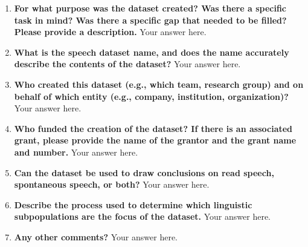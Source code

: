 \documentclass{article}
\begin{document}
    \pagestyle{fancy}
    \fancyhead{} %

    \twocolumn
    \noindent{}
    \begin{enumerate}[leftmargin=0.65cm]
    \scriptsize
        \item \textbf{For what purpose was the dataset created? Was there a specific task in mind? Was there a specific gap that needed to be filled? Please provide a description.} 
        \newline 
        Your answer here.
        \newline 
        
        \item \textbf{What is the speech dataset name, and does the name accurately describe the contents of the dataset?} 
        \newline 
        Your answer here.
        \newline 
        
        \item \textbf{Who created this dataset (e.g., which team, research group) and on behalf of which entity (e.g., company, institution, organization)?}
        \newline 
        Your answer here.
        \newline 
        
        \item \textbf{Who funded the creation of the dataset? If there is an associated grant, please provide the name of the grantor and the grant name and number.}
        \newline 
        Your answer here.
        \newline 
        
        \item \textbf{Can the dataset be used to draw conclusions on read speech, spontaneous speech, or both?}
        \newline 
       Your answer here.
        \newline 
        
        \item \textbf{Describe the process used to determine which linguistic subpopulations are the focus of the dataset.}
        \newline 
        Your answer here.
        \newline 
        
        \item \textbf{ Any other comments?}
        \newline 
        Your answer here.
        \newline 
    \end{enumerate}
\end{document}
